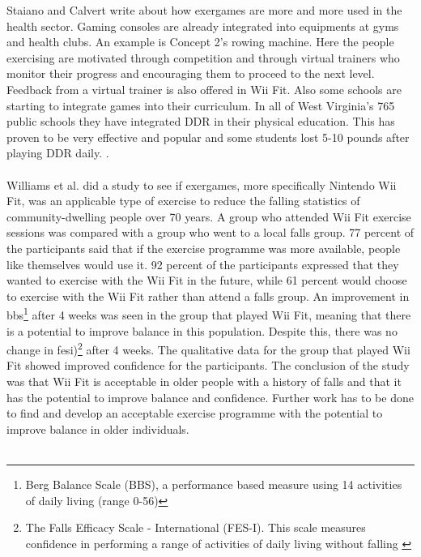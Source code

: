 Staiano and Calvert write about how exergames are more and more used in the health sector. Gaming consoles are already integrated into equipments at gyms and health clubs. An example is Concept 2’s rowing machine. Here the people exercising are motivated through competition and through virtual trainers who monitor their progress and encouraging them to proceed to the next level. Feedback from a virtual trainer is also offered in Wii Fit. Also some schools are starting to integrate games into their curriculum. In all of West Virginia’s 765 public schools they have integrated DDR in their physical education. This has proven to be very effective and popular and some students lost 5-10 pounds after playing DDR daily. \cite{staiano2011exergames}. \\ \\
Williams et al. did a study to see if exergames, more specifically Nintendo Wii Fit, was an applicable type of exercise to reduce the falling statistics of community-dwelling people over 70 years. A group who attended Wii Fit exercise sessions was compared with a group who went to a local falls group. 77 percent of the participants said that if the exercise programme was more available, people like themselves would use it. 92 percent of the participants expressed that they wanted to exercise with the Wii Fit in the future, while 61 percent would choose to exercise with the Wii Fit rather than attend a falls group. An improvement in \ac{bbs}\footnote{Berg Balance Scale (BBS), a performance based measure using 14 activities of daily living (range 0-56)\cite{excell}} after 4 weeks was seen in the group that played Wii Fit, meaning that there is a potential to improve balance in this population. Despite this, there was no change in \ac{fesi})\footnote{The Falls Efficacy Scale - International (FES-I). This scale measures confidence in performing a range of activities of daily living without falling \cite{fes}} after 4 weeks. The qualitative data for the group that played Wii Fit showed improved confidence for the participants. The conclusion of the study was that Wii Fit is acceptable in  older people with a history of falls and that it has the potential to improve balance and confidence. Further work has to be done to find and develop an acceptable exercise programme with the potential to improve balance in older individuals. \cite{excell}\\ \\
